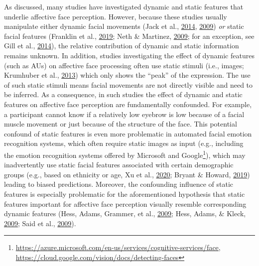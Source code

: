 \documentclass[11pt,american,a4paper,oneside,]{memoir} %
\let\rmarkdownfootnote\footnote%
\def\footnote{\protect\rmarkdownfootnote}
\begin{document}
As discussed, many studies have investigated dynamic and static features that underlie affective face perception. However, because these studies usually manipulate either dynamic facial movements (Jack et al., \protect\hyperlink{ref-Jack2014-ku}{2014}, \protect\hyperlink{ref-Jack2009-yy}{2009}) \emph{or} static facial features (Franklin et al., \protect\hyperlink{ref-Franklin2019-qo}{2019}; Neth \& Martinez, \protect\hyperlink{ref-Neth2009-eh}{2009}; for an exception, see Gill et al., \protect\hyperlink{ref-Gill2014-hx}{2014}), the relative contribution of dynamic and static information remains unknown. In addition, studies investigating the effect of dynamic features (such as AUs) on affective face processing often use static stimuli (i.e., images; Krumhuber et al., \protect\hyperlink{ref-Krumhuber2013-qi}{2013}) which only shows the ``peak'' of the expression. The use of such static stimuli means facial movements are not directly visible and need to be inferred. As a consequence, in such studies the effect of dynamic and static features on affective face perception are fundamentally confounded. For example, a participant cannot know if a relatively low eyebrow is low because of a facial muscle movement or just because of the structure of the face. This potential confound of static features is even more problematic in automated facial emotion recognition systems, which often require static images as input (e.g., including the emotion recognition systems offered by Microsoft and Google\footnote{\url{https://azure.microsoft.com/en-us/services/cognitive-services/face}, \url{https://cloud.google.com/vision/docs/detecting-faces}}), which may inadvertently use static facial features associated with certain demographic groups (e.g., based on ethnicity or age, Xu et al., \protect\hyperlink{ref-Xu2020-jd}{2020}; Bryant \& Howard, \protect\hyperlink{ref-Bryant2019-sg}{2019}) leading to biased predictions. Moreover, the confounding influence of static features is especially problematic for the aforementioned hypothesis that static features important for affective face perception visually resemble corresponding dynamic features (Hess, Adams, Grammer, et al., \protect\hyperlink{ref-Hess2009-jz}{2009}; Hess, Adams, \& Kleck, \protect\hyperlink{ref-Hess2009-xo}{2009}; Said et al., \protect\hyperlink{ref-Said2009-tf}{2009}).
\end{document}
